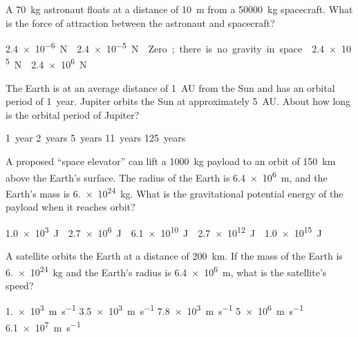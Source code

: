 \documentclass{../../oss-classkick-exam}
\begin{document}
\genheader


\genmultidirections

\gengravity

\raggedcolumns
\begin{multicols*}{2}
  \begin{questions}
    \question A \SI{70}{\kilo\gram} astronaut floats at a distance of
    \SI{10}{\metre} from a \SI{50000}{\kilo\gram} spacecraft. What is the force
    of attraction between the astronaut and spacecraft?
    \begin{choices}
      \choice\SI{2.4e-6}\newton
      \choice\SI{2.4e-5}\newton
      \choice Zero; there is no gravity in space.
      \choice\SI{2.4e5}\newton
      \choice\SI{2.4e6}\newton
    \end{choices}
    \vspace{.5in}
    
    \question The Earth is at an average distance of \SI{1}{AU} from the Sun
    and has an orbital period of \SI{1}{year}. Jupiter orbits the Sun at
    approximately \SI{5}{AU}. About how long is the orbital period of Jupiter?
    \begin{choices}
      \choice\SI{1}{year}
      \choice\SI{2}{years}
      \choice\SI{5}{years}
      \choice\SI{11}{years}
      \choice\SI{125}{years}
    \end{choices}
    
    \question A proposed ``space elevator'' can lift a \SI{1000}{\kilo\gram}
    payload to an orbit of \SI{150}{\kilo\metre} above the Earth's surface. The
    radius of the Earth is \SI{6.4e6}{\metre}, and the Earth's mass is
    \SI{6.e24}{\kilo\gram}. What is the gravitational potential energy of the
    payload when it reaches orbit?
    \begin{choices}
      \choice\SI{1.0e3}\joule
      \choice\SI{2.7e6}\joule
      \choice\SI{6.1e10}\joule
      \choice\SI{2.7e12}\joule
      \choice\SI{1.0e15}\joule
    \end{choices}
    
    \question A satellite orbits the Earth at a distance of
    \SI{200}{\kilo\metre}. If the mass of the Earth is \SI{6.e24}{\kilo\gram}
    and the Earth's radius is \SI{6.4e6}{\metre}, what is the satellite's speed?
    \begin{choices}
      \choice\SI{1.e3}{\metre\per\second}
      \choice\SI{3.5e3}{\metre\per\second}
      \choice\SI{7.8e3}{\metre\per\second}
      \choice\SI{5e6}{\metre\per\second}
      \choice\SI{6.1e7}{\metre\per\second}
    \end{choices}
    

\end{questions}
\end{multicols*}
\end{document}
